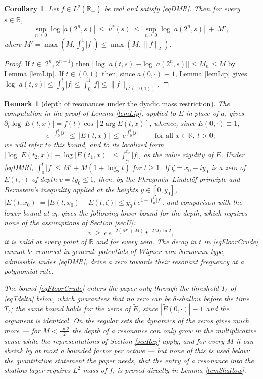 \documentclass[11pt,twoside,reqno]{amsart}
\def\ti{\tilde}
\def\pa{\partial}
\def\R{{\mathbb R}}
\def\d{\delta}
\theoremstyle{plain}
\newtheorem{corollary}{Corollary}
\newtheorem{remark}{Remark}
\numberwithin{equation}{section}
\begin{document}
\begin{corollary}\label{corLac} Let $f\in L^2(\R_+)$ be real and satisfy \eqref{eqDMR}. Then for every $s\in\R$,
$$\sup_{n\geq 0}\log|a(2^n,s)| \ \leq\ u^*(s)\ \leq\ \sup_{n\geq 0}\log|a(2^n,s)| \ +\ M',$$
where $M'=\max\left(M, \int_0^1|f|\right)\leq \max\left(M,\|f\|_2\right)$.
\end{corollary}

\begin{proof} If $t\in[2^n,2^{n+1})$ then $|\log|a(t,s)|-\log|a(2^n,s)||\leq M_n\leq M$ by Lemma \ref{lemLip}. If $t\in(0,1)$ then, since $a(0,\cdot)\equiv 1$, Lemma \ref{lemLip} gives $\log|a(t,s)|\leq \int_0^t|f|\leq\int_0^1 |f|\leq \|f\|_{L^2((0,1))}$.
\end{proof}

\begin{remark}[depth of resonances under the dyadic mass restriction]\label{remFloor}
The computation in the proof of Lemma \ref{lemLip}, applied to $E$ in place of $a$, gives $\pa_t\log|E(t,x)|=f(t)\cos[2\arg E(t,x)]$, whence, since $E(0,\cdot)\equiv1$,
$$e^{-\int_0^t|f|}\ \leq\ |E(t,x)|\ \leq\ e^{\int_0^t|f|}\qquad\text{ for all }x\in\R,\ t>0 ;$$
we will refer to this bound, and to its localized form $\big|\log|E(t_2,x)|-\log|E(t_1,x)|\big|\leq\int_{t_1}^{t_2}|f|$, as the {\it value rigidity} of $E$.
Under \eqref{eqDMR}, $\int_0^t|f|\leq M'+M(1+\log_2t)$ for $t\geq1$. If $\zeta=x_0-iy_0$ is a zero of $E(t,\cdot)$ of depth $v=ty_0\leq1$, then, by the Phragm\'en--Lindel\"of principle and Bernstein's inequality applied at the heights $y\in[0,y_0]$, $|E(t,x_0)|=|E(t,x_0)-E(t,\zeta)|\leq y_0\,t\,e^{1+\int_0^t|f|}$, and comparison with the lower bound at $x_0$ gives the following lower bound for the depth, which requires none of the assumptions of Section \ref{secU}:
\begin{equation}
v\ \geq\ c\,e^{-2(M'+M)}\,t^{-2M/\ln 2},
\label{eqFloorCrude}
\end{equation}
it is valid at every point of $\R$ and for every zero. The decay in $t$ in \eqref{eqFloorCrude} cannot be removed in general: potentials of Wigner--von Neumann type, admissible under \eqref{eqDMR}, drive a zero towards their resonant frequency at a polynomial rate.

The bound \eqref{eqFloorCrude} enters the paper only through the threshold $T_\d$ of \eqref{eqTdelta} below, which guarantees that no zero can be $\d$-shallow before the time $T_\d$; the same bound holds for the zeros of $\ti E$, since $|\ti E(0,\cdot)|\equiv1$ and the argument is identical. On the regular sets the dynamics of the zeros gives much more --- for $M<\frac{\ln2}2$ the depth of a resonance can only grow in the multiplicative sense while the representations of Section \ref{secRep} apply, and for every $M$ it can shrink by at most a bounded factor per octave --- but none of this is used below: the quantitative statement the paper needs, that the entry of a resonance into the shallow layer requires $L^2$ mass of $f$, is proved directly in Lemma \ref{lemShallow}.

%
%
\end{remark}
\end{document}
